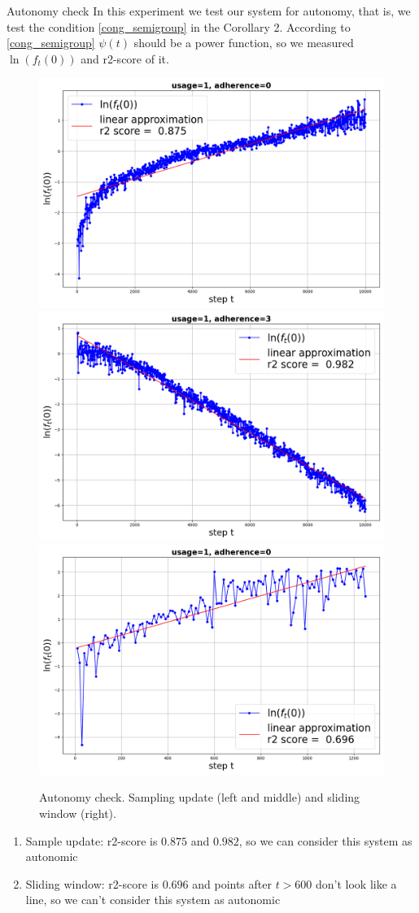\documentclass[aspectratio=169]{beamer}
\begin{document}
    \begin{frame}{Autonomy check}
        \small
        In this experiment we test our system for autonomy, that is, we test the condition \eqref{cong_semigroup} in the Corollary 2. According to \eqref{cong_semigroup} $\psi(t)$ should be a power function, so we measured $\ln(f_t(0))$ and r2-score of it.

        \begin{figure}[h!]
            \centering
            \includegraphics[width=0.32\linewidth]{pictures/semigroup_sample_1_0.png}
            \includegraphics[width=0.32\linewidth]{pictures/semigroup_sample_1_3.png}
            \includegraphics[width=0.32\linewidth]{pictures/semigroup_loop_1_0.png}
            
            \caption{Autonomy check. Sampling update (left and middle) and sliding window (right).}
            \label{fig_exp_4}
        \end{figure}

        \begin{enumerate}
            \item Sample update: r2-score is $0.875$ and $0.982$, so we can consider this system as autonomic

            \item Sliding window: r2-score is $0.696$ and points after $t > 600$ don't look like a line, so we can't consider this system as autonomic
        \end{enumerate}
    \end{frame}
\end{document}
